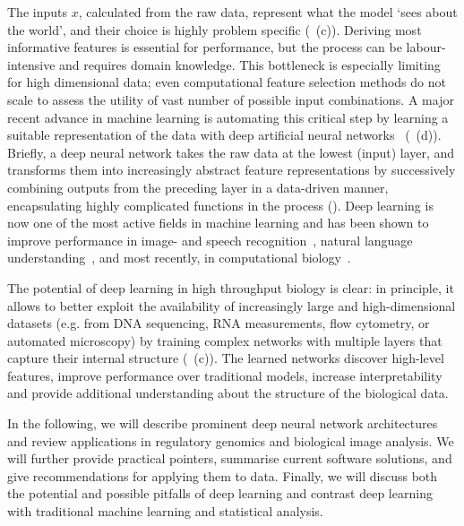 The inputs $x$, calculated from the raw data, represent what the model `sees about the world', and their choice is highly problem specific (~(c)). Deriving most informative features is essential for performance, but the process can be labour-intensive and requires domain knowledge. This bottleneck is especially limiting for high dimensional data; even computational feature selection methods do not scale to assess the utility of vast number of possible input combinations. A major recent advance in machine learning is automating this critical step by learning a suitable representation of the data with deep artificial neural networks~\citep{bengio_representation_2013,lecun_deep_2015,schmidhuber_deep_2015} (~(d)). Briefly, a deep neural network takes the raw data at the lowest (input) layer, and transforms them into increasingly abstract feature representations by successively combining outputs from the preceding layer in a data-driven manner, encapsulating highly complicated functions in the process (). Deep learning is now one of the most active fields in machine learning and has been shown to improve performance in image- and speech recognition~\citep{deng_deep_2015,graves_generating_2013,hinton_deep_2012,krizhevsky_imagenet_2012,zeiler_visualizing_2014-1}, natural language understanding~\citep{bahdanau_neural_2014,lipton_critical_2015,sutskever_sequence_2014,xiong_dynamic_2016}, and most recently, in computational biology~\citep{alipanahi_predicting_2015,dahl_multi-task_2014,eickholt_dndisorder:_2013,kelley_basset:_2016,leung_deep_2014,sonderby_protein_2014,wang_chromatin_2015,zhou_predicting_2015}.

The potential of deep learning in high throughput biology is clear: in principle, it allows to better exploit the availability of increasingly large and high-dimensional datasets (e.g. from DNA sequencing, RNA measurements, flow cytometry, or automated microscopy) by training complex networks with multiple layers that capture their internal structure (~(c)). The learned networks discover high-level features, improve performance over traditional models, increase interpretability and provide additional understanding about the structure of the biological data.

In the following, we will describe prominent deep neural network architectures and review applications in regulatory genomics and biological image analysis. We will further provide practical pointers, summarise current software solutions, and give recommendations for applying them to data. Finally, we will discuss both the potential and possible pitfalls of deep learning and contrast deep learning with traditional machine learning and statistical analysis.


